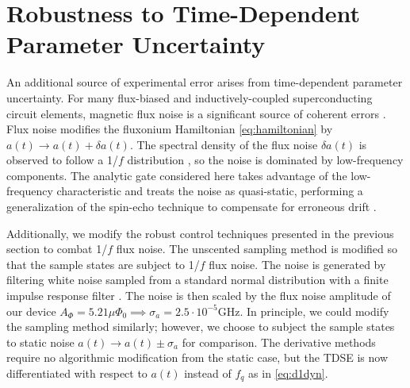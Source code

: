 \section{Robustness to Time-Dependent Parameter Uncertainty \label{sec:stochastic}}
An additional source of experimental error arises from time-dependent
parameter uncertainty. For many flux-biased and inductively-coupled
superconducting circuit elements, magnetic flux noise is a significant
source of coherent errors . Flux noise
modifies the fluxonium Hamiltonian \eqref{eq:hamiltonian}
by $a(t) \rightarrow a(t) + \delta a(t)$.
The spectral density of the flux noise $\delta a(t)$ is observed to
follow a 1/$f$ distribution
\cite{bialczak20071f, koch2007model,
  yoshihara2006decoherence, yoshihara2010correlated},
so the noise is dominated by low-frequency components.
The analytic gate considered here
takes advantage of the low-frequency characteristic and
treats the noise as quasi-static, performing a generalization of the spin-echo
technique to compensate for erroneous drift \cite{hahn1952spin, meiboom1958modified}.

Additionally, we modify the robust control techniques presented
in the previous section to combat 1/$f$ flux noise.
The unscented sampling method is modified so that the sample states
are subject to 1/$f$ flux noise. The noise
is generated by filtering white noise sampled from a standard
normal distribution with a finite impulse response filter \cite{saspweb2011}.
The noise is then scaled by the 
flux noise amplitude of our device $A_{\Phi} = 5.21 \mu \Phi_{0} \implies
\sigma_{a} = 2.5 \cdot 10^{-5} \textrm{GHz}$.
In principle, we could modify the sampling method
similarly; however, we choose to subject the sample states
to static noise
$a(t) \rightarrow a(t) \pm \sigma_{a}$
for comparison. The derivative methods require no algorithmic modification
from the static case, but the TDSE is now differentiated with respect
to $a(t)$ instead of $f_{q}$ as in \eqref{eq:d1dyn}.

